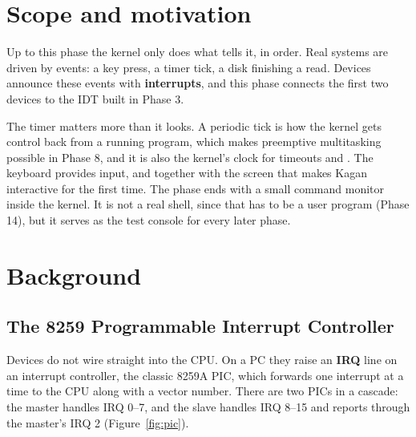 \documentclass[11pt,a4paper]{article}
\begin{document}


\section{Scope and motivation}

Up to this phase the kernel only does what  tells it, in order. Real systems are driven by events: a key press, a
timer tick, a disk finishing a read. Devices announce these events with \textbf{interrupts}, and this phase
connects the first two devices to the IDT built in Phase 3.

The timer matters more than it looks. A periodic tick is how the kernel gets control back from a running program,
which makes preemptive multitasking possible in Phase 8, and it is also the kernel's clock for timeouts and
. The keyboard provides input, and together with the screen that makes Kagan interactive for the first
time. The phase ends with a small command monitor inside the kernel. It is not a real shell, since that has
to be a user program (Phase 14), but it serves as the test console for every later phase.

\section{Background}

\subsection{The 8259 Programmable Interrupt Controller}

Devices do not wire straight into the CPU. On a PC they raise an \textbf{IRQ} line on an interrupt controller, the
classic 8259A PIC, which forwards one interrupt at a time to the CPU along with a vector number. There are two PICs in
a cascade: the master handles IRQ 0--7, and the slave handles IRQ 8--15 and reports through the master's IRQ 2
(Figure~\ref{fig:pic}).
\end{document}

